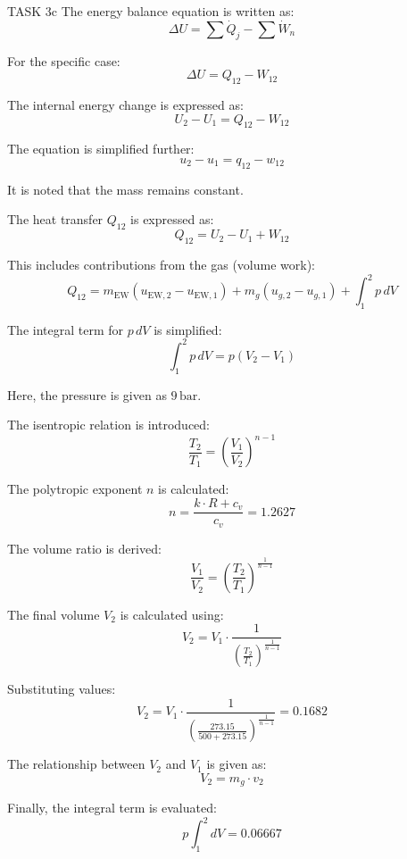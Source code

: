 TASK 3c  
The energy balance equation is written as:  
\[
\Delta U = \sum \dot{Q}_j - \sum \dot{W}_n
\]  

For the specific case:  
\[
\Delta U = Q_{12} - W_{12}
\]  

The internal energy change is expressed as:  
\[
U_2 - U_1 = Q_{12} - W_{12}
\]  

The equation is simplified further:  
\[
u_2 - u_1 = q_{12} - w_{12}
\]  

It is noted that the mass remains constant.  

The heat transfer \( Q_{12} \) is expressed as:  
\[
Q_{12} = U_2 - U_1 + W_{12}
\]  

This includes contributions from the gas (volume work):  
\[
Q_{12} = m_{\text{EW}} (u_{\text{EW},2} - u_{\text{EW},1}) + m_g (u_{g,2} - u_{g,1}) + \int_{1}^{2} p \, dV
\]  

The integral term for \( p \, dV \) is simplified:  
\[
\int_{1}^{2} p \, dV = p (V_2 - V_1)
\]  

Here, the pressure is given as \( 9 \, \text{bar} \).  

The isentropic relation is introduced:  
\[
\frac{T_2}{T_1} = \left( \frac{V_1}{V_2} \right)^{n-1}
\]  

The polytropic exponent \( n \) is calculated:  
\[
n = \frac{k \cdot R + c_v}{c_v} = 1.2627
\]  

The volume ratio is derived:  
\[
\frac{V_1}{V_2} = \left( \frac{T_2}{T_1} \right)^{\frac{1}{n-1}}
\]  

The final volume \( V_2 \) is calculated using:  
\[
V_2 = V_1 \cdot \frac{1}{\left( \frac{T_2}{T_1} \right)^{\frac{1}{n-1}}}
\]  

Substituting values:  
\[
V_2 = V_1 \cdot \frac{1}{\left( \frac{273.15}{500 + 273.15} \right)^{\frac{1}{n-1}}} = 0.1682
\]  

The relationship between \( V_2 \) and \( V_1 \) is given as:  
\[
V_2 = m_g \cdot v_2
\]  

Finally, the integral term is evaluated:  
\[
p \int_{1}^{2} dV = 0.06667
\]